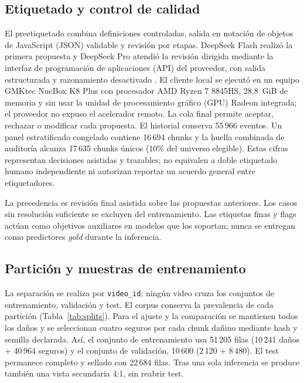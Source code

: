 \subsection{Etiquetado y control de calidad}

El preetiquetado combina definiciones controladas, salida en notación de objetos de JavaScript (JSON) validable y revisión por etapas. DeepSeek Flash realizó la primera propuesta y DeepSeek Pro atendió la revisión dirigida mediante la interfaz de programación de aplicaciones (API) del proveedor, con salida estructurada y razonamiento desactivado \cite{deepseek2026v4,deepseek2026json,deepseek2026thinking}. El cliente local se ejecutó en un equipo GMKtec NucBox K8 Plus con procesador AMD Ryzen 7 8845HS, 28,8~GiB de memoria y sin usar la unidad de procesamiento gráfico (GPU) Radeon integrada; el proveedor no expuso el acelerador remoto. La cola final permite aceptar, rechazar o modificar cada propuesta. El historial conserva 55\,966 eventos. Un panel estratificado congelado contiene 16\,694 chunks y la huella combinada de auditoría alcanza 17\,635 chunks únicos (10\% del universo elegible). Estas cifras representan decisiones asistidas y trazables; no equivalen a doble etiquetado humano independiente ni autorizan reportar un acuerdo general entre etiquetadores.

La precedencia es revisión final asistida sobre las propuestas anteriores. Los casos sin resolución suficiente se excluyen del entrenamiento. Las etiquetas finas y flags actúan como objetivos auxiliares en modelos que los soportan; nunca se entregan como predictores \emph{gold} durante la inferencia.

\subsection{Partición y muestras de entrenamiento}

La separación se realiza por \texttt{video\_id}; ningún video cruza los conjuntos de entrenamiento, validación y test. El corpus conserva la prevalencia de cada partición (Tabla~\ref{tab:splits}). Para el ajuste y la comparación se mantienen todos los daños y se seleccionan cuatro seguros por cada chunk dañino mediante hash y semilla declarada. Así, el conjunto de entrenamiento usa 51\,205 filas (10\,241 daños + 40\,964 seguros) y el conjunto de validación, 10\,600 (2\,120 + 8\,480). El test permanece completo y sellado con 22\,684 filas. Tras una sola inferencia se produce también una vista secundaria 4:1, sin reabrir test.

